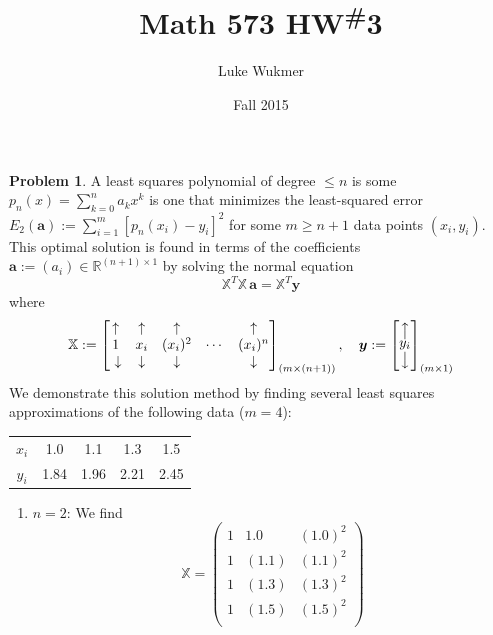 \documentclass[10pt]{article}
\theoremstyle{plain}
\theoremstyle{definition}
\newtheorem{prob}{Problem}
\providecommand{\R}{\mathbb{R}}%
\numberwithin{equation}{section}
\newcommand*\mcol[1]{\overset{\big\uparrow}{\underset{\big\downarrow}{#1}}}
\begin{document}
\title{Math 573 HW\textsuperscript{\#}3}
\author{Luke Wukmer}
\date{Fall 2015}
\maketitle \thispagestyle{empty} %
\lstset{language=Python}

\begin{prob}
    A least squares polynomial of degree $\leq n$ is some $p_n(x) = \sum_{k=0}^n a_k x^k$
    is one that minimizes the least-squared error
    $E_2(\bm{a}) := \sum_{i=1}^{m}\left[p_n(x_i) - y_i\right]^2$
    for some $m \geq n+1$ data points $(x_i, y_i)$.  
    This optimal solution is found in terms of the coefficients
    $\bm{a} := (a_i) \in \R^{(n+1) \times 1}$ by solving the normal equation
    \[      
            \mathbb{X}^T\mathbb{X}\, \bm{a} = \mathbb{X}^T \bm{y}
    \]
    where \[
            \mathbb{X} := \begin{bmatrix}
                \uparrow & \uparrow & \uparrow &    & \uparrow \\
            1       & x_i & (x_i)^2 & \cdots & (x_i)^n      \\\
            \downarrow & \downarrow & \downarrow &  & \downarrow 
            \end{bmatrix}_{(m \times (n+1))} , \quad
        \bm{y} := \begin{bmatrix}\mcol{y_i}\end{bmatrix}_{(m \times 1)}
\]
We demonstrate this solution method by finding several least squares approximations of the
following data ($m=4$):
    \begin{center}
        \begin{tabular}{c c c c c}
        \hline
        $x_i$ & 1.0 & 1.1 & 1.3 & 1.5 \\
        $y_i$ & 1.84 & 1.96 & 2.21 & 2.45\\
        \hline
    \end{tabular} 
    \end{center}
\begin{enumerate}[\bfseries(a)]
\item $n=2$: We find 
    \[
            \mathbb{X} = \begin{pmatrix}
                1 & 1.0 & (1.0)^2 \\
                1 & (1.1) & (1.1)^2 \\
                1 & (1.3) & (1.3)^2 \\
                1 & (1.5) & (1.5)^2 \\

\end{pmatrix}\]
\end{enumerate}
\end{prob}
\end{document}
